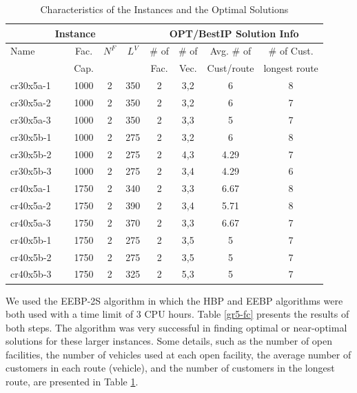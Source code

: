 \documentclass[graybox]{./styles/svmult}
\begin{document}
\begin{table}[ht]
\centering
\caption{Characteristics of the Instances and the Optimal Solutions}\label{soln-tb}
\begin {tabular}[t]{|l|c|c|c|c|c|c|c|}  
\hline
 \multicolumn{4}{|c|}{Instance} & \multicolumn{4}{|c|}{OPT/BestIP Solution Info} \\\hline
Name & Fac.& $N^F$ & $L^V$ &  \# of & \# of & Avg. \# of & \# of Cust. \\
\mbox{} & \mbox{Cap.} & \mbox{} & \mbox{} & Fac. & Vec. & Cust/route & longest route \\\hline
cr30x5a-1  \ \	&	1000	&	2	&	350	&	2	&	3,2	&	6	&	8	\\
cr30x5a-2  \ \	&	1000	&	2	&	350	&	2	&	3,2	&	6	&	7	\\
cr30x5a-3  \ \	&	1000	&	2	&	350	&	2	&	3,3	&	5	&	7	\\
cr30x5b-1  \ \	&	1000	&	2	&	275	&	2	&	3,2	&	6	&	8	\\
cr30x5b-2  \ \	&	1000	&	2	&	275	&	2	&	4,3	&	4.29	&	7	\\
cr30x5b-3  \ \	&	1000	&	2	&	275	&	2	&	3,4	&	4.29	&	6	\\
cr40x5a-1  \ \	&	1750	&	2	&	340	&	2	&	3,3	&	6.67	&	8	\\
cr40x5a-2  \ \	&	1750	&	2	&	390	&	2	&	3,4	&	5.71	&	8	\\
cr40x5a-3  \ \	&	1750	&	2	&	370	&	2	&	3,3	&	6.67	&	7	\\
cr40x5b-1  \ \	&	1750	&	2	&	275	&	2	&	3,5	&	5	&	7	\\
cr40x5b-2 \ \ 	&	1750	&	2	&	275	&	2	&	3,5	&	5	&	7	\\
cr40x5b-3  \ \	&	1750	&	2	&	325	&	2	&	5,3	&	5	&	7	\\
\hline
\end{tabular}
\end{table} 
We used the EEBP-2S algorithm in which the HBP and EEBP algorithms
were both used with a time limit of 3 CPU hours. Table \ref{gr5-fc}
presents the results of both steps. The algorithm was very successful
in finding optimal or near-optimal solutions for these larger
instances. 
Some details, such as the number of open facilities, the number of
vehicles used at each open facility, the average number of customers
in each route (vehicle), and the number of customers in the longest
route, are presented in Table
\ref{soln-tb}.
\end{document}
